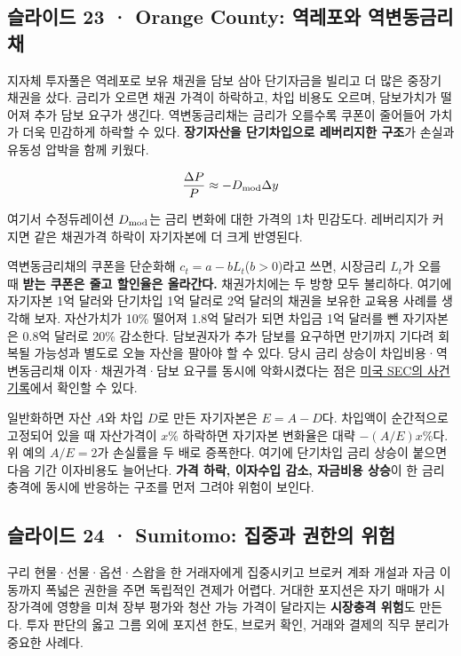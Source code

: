 \documentclass[11pt,a4paper]{article}
\begin{document}
\subsection{슬라이드 23 · Orange County: 역레포와 역변동금리채}
지자체 투자풀은 역레포로 보유 채권을 담보 삼아 단기자금을 빌리고 더 많은 중장기 채권을 샀다. 금리가 오르면 채권 가격이 하락하고, 차입 비용도 오르며, 담보가치가 떨어져 추가 담보 요구가 생긴다. 역변동금리채는 금리가 오를수록 쿠폰이 줄어들어 가치가 더욱 민감하게 하락할 수 있다. \textbf{장기자산을 단기차입으로 레버리지한 구조}가 손실과 유동성 압박을 함께 키웠다.\par

\[
\frac{\Delta P}{P}\approx -D_{\rm mod}\Delta y
\]

여기서 수정듀레이션 $D_{\rm mod}$는 금리 변화에 대한 가격의 1차 민감도다. 레버리지가 커지면 같은 채권가격 하락이 자기자본에 더 크게 반영된다.\par

역변동금리채의 쿠폰을 단순화해 $c_t=a-bL_t$($b>0$)라고 쓰면, 시장금리 $L_t$가 오를 때 \textbf{받는 쿠폰은 줄고 할인율은 올라간다.} 채권가치에는 두 방향 모두 불리하다. 여기에 자기자본 1억 달러와 단기차입 1억 달러로 2억 달러의 채권을 보유한 교육용 사례를 생각해 보자. 자산가치가 10\% 떨어져 1.8억 달러가 되면 차입금 1억 달러를 뺀 자기자본은 0.8억 달러로 20\% 감소한다. 담보권자가 추가 담보를 요구하면 만기까지 기다려 회복될 가능성과 별도로 오늘 자산을 팔아야 할 수 있다. 당시 금리 상승이 차입비용·역변동금리채 이자·채권가격·담보 요구를 동시에 악화시켰다는 점은 \href{https://www.sec.gov/enforcement-litigation/administrative-proceedings/33-8141}{미국 SEC의 사건 기록}에서 확인할 수 있다.\par

일반화하면 자산 $A$와 차입 $D$로 만든 자기자본은 $E=A-D$다. 차입액이 순간적으로 고정되어 있을 때 자산가격이 $x\%$ 하락하면 자기자본 변화율은 대략 $-(A/E)x\%$다. 위 예의 $A/E=2$가 손실률을 두 배로 증폭한다. 여기에 단기차입 금리 상승이 붙으면 다음 기간 이자비용도 늘어난다. \textbf{가격 하락, 이자수입 감소, 자금비용 상승}이 한 금리 충격에 동시에 반응하는 구조를 먼저 그려야 위험이 보인다.\par

\subsection{슬라이드 24 · Sumitomo: 집중과 권한의 위험}
구리 현물·선물·옵션·스왑을 한 거래자에게 집중시키고 브로커 계좌 개설과 자금 이동까지 폭넓은 권한을 주면 독립적인 견제가 어렵다. 거대한 포지션은 자기 매매가 시장가격에 영향을 미쳐 장부 평가와 청산 가능 가격이 달라지는 \textbf{시장충격 위험}도 만든다. 투자 판단의 옳고 그름 외에 포지션 한도, 브로커 확인, 거래와 결제의 직무 분리가 중요한 사례다.\par
\end{document}
